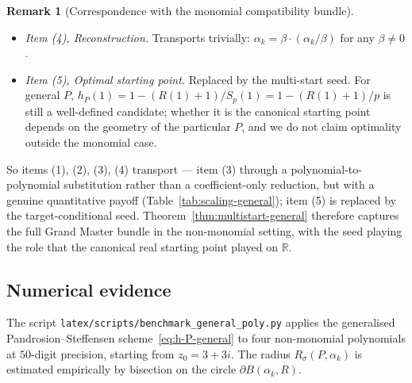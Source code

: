 \documentclass[11pt,a4paper]{article}
\theoremstyle{definition}
\newtheorem{remark}{Remark}[section]
\begin{document}
\begin{remark}[Correspondence with the monomial compatibility bundle]
\begin{itemize}
  \item \emph{Item (4), Reconstruction.} Transports trivially: $\alpha_k = \beta \cdot (\alpha_k/\beta)$ for any $\beta \neq 0$.
  \item \emph{Item (5), Optimal starting point.} Replaced by the multi-start seed. For general $P$, $h_P(1) = 1 - (R(1) + 1)/S_p(1) = 1 - (R(1)+1)/p$ is still a well-defined candidate; whether it is the canonical starting point depends on the geometry of the particular $P$, and we do not claim optimality outside the monomial case.
\end{itemize}
So items (1), (2), (3), (4) transport --- item (3) through a polynomial-to-polynomial substitution rather than a coefficient-only reduction, but with a genuine quantitative payoff (Table~\ref{tab:scaling-general}); item (5) is replaced by the target-conditional seed. Theorem~\ref{thm:multistart-general} therefore captures the full Grand Master bundle in the non-monomial setting, with the seed playing the role that the canonical real starting point played on $\mathbb{R}$.
\end{remark}

\subsection{Numerical evidence}

The script \texttt{latex/scripts/benchmark\_general\_poly.py} applies the generalised Pandrosion--Steffensen scheme~\eqref{eq:h-P-general} to four non-monomial polynomials at $50$-digit precision, starting from $z_0 = 3 + 3i$. The radius $R_\sigma(P, \alpha_k)$ is estimated empirically by bisection on the circle $\partial B(\alpha_k, R)$.
\end{document}
